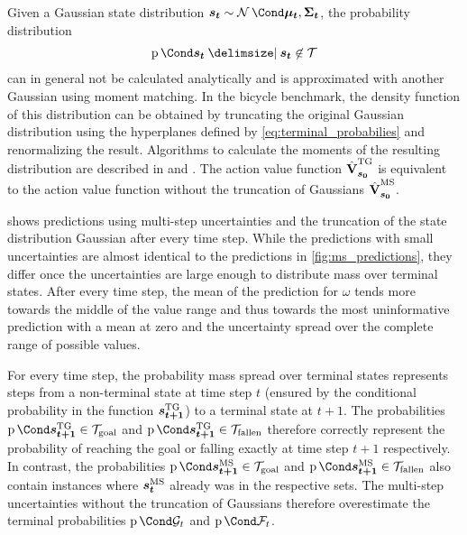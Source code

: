 Given a Gaussian state distribution $\rv{s_t} \sim \Gaussian{\mat{\mu_t}, \mat{\Sigma_t}}$, the probability distribution
\begin{align}
    \Prob{\rv{s_t} \given \rv{s_t} \not\in\Tee}
\end{align}
can in general not be calculated analytically and is approximated with another Gaussian using moment matching.
In the bicycle benchmark, the density function of this distribution can be obtained by truncating the original Gaussian distribution using the hyperplanes defined by \cref{eq:terminal_probabilies} and renormalizing the result.
Algorithms to calculate the moments of the resulting distribution are described in \cite{herbrich_gaussian_2005} and \cite{toussaint_technical_2009}.
The action value function $\operatorname{\hat{\operatorname{\mathbf{V}}}}^{\text{TG}}_{\bm{s_0}}$ is equivalent to the action value function without the truncation of Gaussians $\operatorname{\hat{\operatorname{\mathbf{V}}}}^{\text{MS}}_{\bm{s_0}}$.

 shows predictions using multi-step uncertainties and the truncation of the state distribution Gaussian after every time step.
While the predictions with small uncertainties are almost identical to the predictions in \cref{fig:ms_predictions}, they differ once the uncertainties are large enough to distribute mass over terminal states.
After every time step, the mean of the prediction for $\omega$ tends more towards the middle of the value range and thus towards the most uninformative prediction with a mean at zero and the uncertainty spread over the complete range of possible values.

For every time step, the probability mass spread over terminal states represents steps from a non-terminal state at time step $t$ (ensured by the conditional probability in the function $\bm{s_{t+1}}^{\text{TG}}$) to a terminal state at $t+1$.
The probabilities $\Prob{\tg{\rv{s_{t+1}}} \in \Goal}$ and $\Prob{\tg{\rv{s_{t+1}}} \in \Fallen}$ therefore correctly represent the probability of reaching the goal or falling exactly at time step $t+1$ respectively.
In contrast, the probabilities $\Prob{\ms{\rv{s_{t+1}}} \in \Goal}$ and $\Prob{\ms{\rv{s_{t+1}}} \in \Fallen}$ also contain instances where $\bm{s_t}^{\text{MS}}$ already was in the respective sets.
The multi-step uncertainties without the truncation of Gaussians therefore overestimate the terminal probabilities $\Prob{\PGoal_t}$ and $\Prob{\PFallen_t}$.

